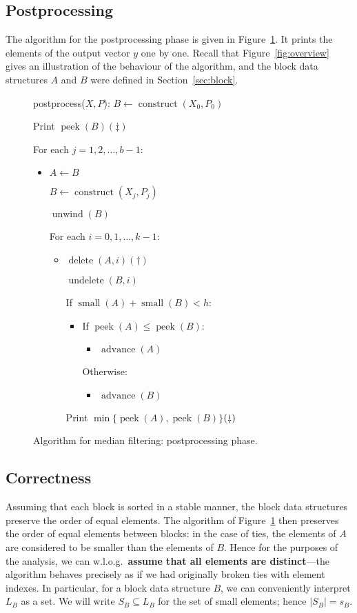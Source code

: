 \documentclass[a4paper,11pt]{article}
\DeclareMathOperator{\Construct}{construct}
\DeclareMathOperator{\Delete}{delete}
\DeclareMathOperator{\Undelete}{undelete}
\DeclareMathOperator{\Unwind}{unwind}
\DeclareMathOperator{\Advance}{advance}
\DeclareMathOperator{\Small}{small}
\DeclareMathOperator{\Peek}{peek}
\newcommand{\algorithm}[2]{\begin{framed}\begin{description}[style=nextline,parsep=2pt,itemsep=9pt,#1]#2
\end{description}\vspace{-4mm}\end{framed}\vspace{-4mm}}
\newcommand{\block}[1]{\begin{itemize}[nolistsep,label=,parsep=2pt,topsep=0pt,leftmargin=10mm]\item #1\end{itemize}\vspace{1pt}}
\newcommand{\codelabel}[1]{\hfill #1}
\begin{document}
\subsection{Postprocessing}

\newcommand{\stepa}{$(\ddagger)$}
\newcommand{\stepc}{$(\rotatebox[origin=c]{180}{$\dagger$})$}
\newcommand{\stepb}{$(\dagger)$}

The algorithm for the postprocessing phase is given in Figure~\ref{fig:alg}. It prints the elements of the output vector $y$ one by one. Recall that Figure~\ref{fig:overview} gives an illustration of the behaviour of the algorithm, and the block data structures $A$ and $B$ were defined in Section~\ref{sec:block}.

\begin{figure}
\algorithm{leftmargin=39mm}{
\item[postprocess($X,P$):]
    $B \gets \Construct(X_0, P_0)$
    
    Print $\Peek(B)$\codelabel{\stepa}
    
    For each $j = 1, 2, \dotsc, b-1$: \block{
        $A \gets B$
        
        $B \gets \Construct(X_j, P_j)$
        
        $\Unwind(B)$
        
        For each $i = 0, 1, \dotsc, k-1$:\block{
            $\Delete(A, i)$\codelabel{\stepb}
            
            $\Undelete(B,i)$
            
            If $\Small(A) + \Small(B) < h$:
            \block{
                If $\Peek(A) \le \Peek(B)$: \block{
                    $\Advance(A)$
                }
                
                Otherwise: \block{
                    $\Advance(B)$
                }
            }
            
            Print $\min \{ \Peek(A), \Peek(B) \}$\codelabel{\stepc}
        }
    }
}
 \caption{Algorithm for median filtering: postprocessing phase.}\label{fig:alg}
\end{figure}

\subsection{Correctness}

Assuming that each block is sorted in a stable manner, the block data structures preserve the order of equal elements. The algorithm of Figure~\ref{fig:alg} then preserves the order of equal elements between blocks: in the case of ties, the elements of $A$ are considered to be smaller than the elements of $B$. Hence for the purposes of the analysis, we can w.l.o.g.\ \textbf{assume that all elements are distinct}---the algorithm behaves precisely as if we had originally broken ties with element indexes. In particular, for a block data structure $B$, we can conveniently interpret $L_B$ as a set. We will write $S_B \subseteq L_B$ for the set of small elements; hence $|S_B| = s_B$.
\end{document}
